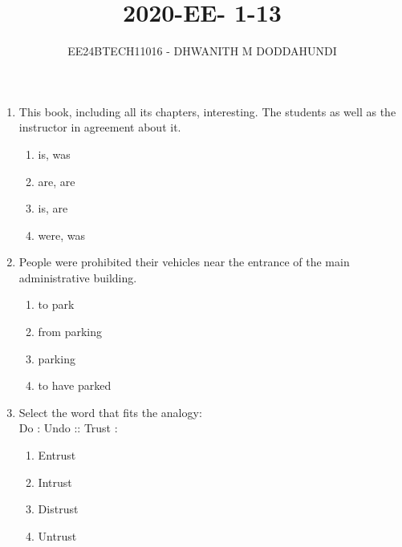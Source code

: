 \documentclass[journal]{IEEEtran}
\begin{document}

\vspace{3cm}

\title{2020-EE- 1-13}
\author{EE24BTECH11016 - DHWANITH M DODDAHUNDI}

{\let\newpage\relax\maketitle}

\renewcommand{\thefigure}{\theenumi}
\renewcommand{\thetable}{\theenumi}
\setlength{\intextsep}{10pt} %

\begin{enumerate}
\item This book, including all its chapters, \underline{\hspace{1cm}}interesting. The students as well as the instructor \underline{\hspace{1cm}} in agreement about it.
\begin{enumerate}
    \item is, was
    \item are, are
    \item is, are
    \item were, was
\end{enumerate}
\item People were prohibited \underline{\hspace{1cm}} their vehicles near the entrance of the main administrative building.
\begin{enumerate}
    \item to park
    \item from parking
    \item parking 
    \item to have parked
\end{enumerate}
\item Select the word that fits the analogy: \\
Do : Undo :: Trust :\underline{\hspace{1cm}}
\begin{enumerate}
    \item Entrust
    \item Intrust
    \item Distrust
    \item Untrust
\end{enumerate}

\end{enumerate}
\end{document}
